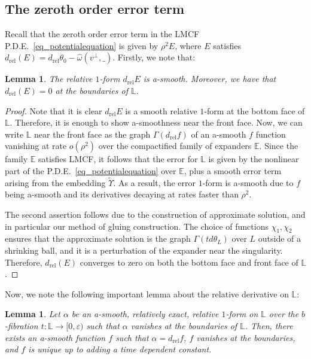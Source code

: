 \documentclass[10pt, a4paper]{article}
\theoremstyle{plain}%
\newtheorem{lem}[theorem]{Lemma}
\theoremstyle{definition}
\numberwithin{figure}{section}
\numberwithin{equation}{section}
\newcommand{\bL}{\mathbb{L}}
\newcommand{\bE}{\mathbb{E}}
\newcommand{\rt}{\rightarrow}
\newcommand{\dr}{d_\mathrm{rel}}
\newcommand{\ep}{\varepsilon}
\newcommand{\rel}{\mathrm{rel}}
\begin{document}
\subsection{The zeroth order error term}
Recall that the zeroth order error term in the LMCF P.D.E.\ \eqref{eq_potentialequation} is given by $\rho^2E$, where $E$ satisfies $\dr(E) = \dr\theta_0-\hat{\omega}(v^\perp,\_)$. Firstly, we note that:
\begin{lem}
	The relative $1$-form $d_\rel E$ is a-smooth. Moreover, we have that $d_\rel(E)=0$ at the boundaries of $\bL$.
\end{lem}
\begin{proof}
	Note that it is clear $d_\rel E$ is a smooth relative $1$-form at the bottom face of $\bL$. Therefore, it is enough to show a-smoothness near the front face. Now, we can write $\bL$ near the front face as the graph $\Gamma(d_\rel f)$ of an a-smooth $f$ function vanishing at rate $o(\rho^2)$ over the compactified family of expanders $\bE$. Since the family $\bE$ satisfies LMCF, it follows that the error for $\bL$ is given by the nonlinear part of the P.D.E.\ \eqref{eq_potentialequation} over $\bE$, plus a smooth error term arising from the embedding $\widetilde{\Upsilon}$. As a result, the error $1$-form is a-smooth due to $f$ being a-smooth and its derivatives decaying at rates faster than $\rho^2$.
	
	The second assertion follows due to the construction of approximate solution, and in particular our method of gluing construction. The choice of functions $\chi_1,\chi_2$ ensures that the approximate solution is the graph $\Gamma(td\theta_L)$ over $L$ outside of a shrinking ball, and it is a perturbation of the expander near the singularity. Therefore, $d_\rel(E)$ converges to zero on both the bottom face and front face of $\bL$. 
\end{proof}
Now, we note the following important lemma about the relative derivative on $\bL$:
\begin{lem}\label{lem_formregularity}
	Let $\alpha$ be an a-smooth, relatively exact, relative $1$-form on $\bL$ over the $b$-fibration $t:\bL\rt [0,\ep)$ such that $\alpha$ vanishes at the boundaries of $\bL$. Then, there exists an a-smooth function $f$ such that $\alpha=d_\rel f$, $f$ vanishes at the boundaries, and $f$ is unique up to adding a time dependent constant.
\end{lem}
\end{document}
